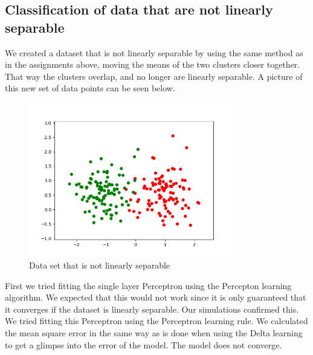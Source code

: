 \documentclass[a4paper]{article}
\begin{document}
\subsection{Classification of data that are not linearly separable}
We created a dataset that is not linearly separable by using the same method as in the assignments above, moving the means of the two clusters closer together. That way the clusters overlap, and no longer are linearly separable. A picture of this new set of data points can be seen below.
\begin{figure}[htb]
    \centering
    \includegraphics[width=0.8\textwidth]{Labs/Lab 1/Lab 1a/Results/overlapping_dataset.png}
    \caption{Data set that is not linearly separable}
    \label{fig:enter-label}
\end{figure}
First we tried fitting the single layer Perceptron using the Percepton learning algorithm. We expected that this would not work since it is only guaranteed that it converges if the dataset is linearly separable. Our simulations confirmed this. We tried fitting this Perceptron using the Perceptron learning rule. We calculated the mean square error in the same way as is done when using the Delta learning to get a glimpse into the error of the model. The model does not converge.
\end{document}
